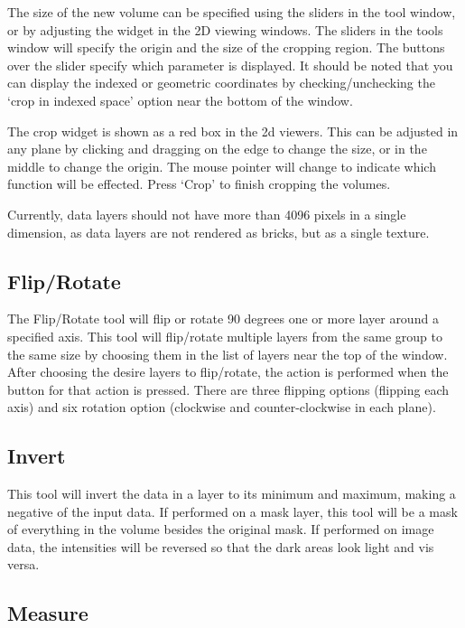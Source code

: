 \documentclass[fleqn,11pt,openany]{book}
\begin{document}
The size of the new volume can be specified using the sliders in the tool window, or by adjusting the widget in the 2D viewing windows.   The sliders in the tools window will specify the origin and the size of the cropping region.  The buttons over the slider specify which parameter is displayed. It should be noted that you can display the indexed or geometric coordinates by checking/unchecking the `crop in indexed space' option near the bottom of the window.  

The crop widget is shown as a red box in the 2d viewers.  This can be adjusted in any plane by clicking and dragging on the edge to change the size, or in the middle to change the origin.  The mouse pointer will change to indicate which function will be effected.  Press `Crop' to finish cropping the volumes.

Currently, data layers should not have more than 4096 pixels in a single dimension, as data layers are not rendered as bricks, but as a single texture.

\subsection{Flip/Rotate}

The Flip/Rotate tool will flip or rotate 90 degrees one or more layer around a specified axis.  This tool will flip/rotate multiple layers from the same group to the same size  by choosing them in the list of layers near the top of the window.  After choosing the desire layers to flip/rotate, the action is performed when the button for that action is pressed.  There are three flipping options (flipping each axis) and six rotation option (clockwise and counter-clockwise in each plane).  

\subsection{Invert}

This tool will invert the data in a layer to its minimum and maximum, making a negative of the input data.  If performed on a mask layer, this tool will be a mask of everything in the volume besides the original mask.  If performed on image data, the intensities will be reversed so that the dark areas look light and vis versa.

\subsection{Measure}
\end{document}

